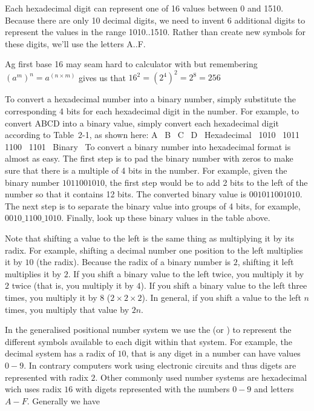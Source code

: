 Each hexadecimal digit can represent one of 16 values between 0 and 1510. Because there are only 10 decimal digits, we need to invent 6 additional digits to represent the values in the range 1010..1510. Rather than create new symbols for these digits, we'll use the letters A..F. 

Ag first base 16 may seam hard to calculator with but remembering $(a^m)^n = a^(n \times m)$ gives us that $16^2 = (2^4)^2 = 2^8 = 256$


To convert a hexadecimal number into a binary number, simply substitute the corresponding 4 bits for each hexadecimal digit in the number. For example, to convert ABCD into a binary value, simply convert each hexadecimal digit according to Table 2-1, as shown here: A  B  C  D  Hexadecimal  1010  1011  1100  1101  Binary  To convert a binary number into hexadecimal format is almost as easy. The first step is to pad the binary number with zeros to make sure that there is a multiple of 4 bits in the number. For example, given the binary number $1011001010$, the first step would be to add 2 bits to the left of the number so that it contains 12 bits. The converted binary value is $001011001010$. The next step is to separate the binary value into groups of 4 bits, for example, $0010\_1100\_1010$. Finally, look up these binary values in the table above.

Note that shifting a value to the left is the same thing as multiplying it by its radix. For example, shifting a decimal number one position to the left multiplies it by $10$ (the radix). Because the radix of a binary number is $2$, shifting it left multiplies it by $2$. If you shift a binary value to the left twice, you multiply it by $2$ twice (that is, you multiply it by $4$). If you shift a binary value to the left three times, you multiply it by $8$ ($2 \times 2 \times 2$). In general, if you shift a value to the left $n$ times, you multiply that value by $2n$.

\myindent In the generalised positional number system we use the  (or ) to represent the different symbols available to each digit within that system. For example, the decimal system has a radix of $10$, that is any diget in a number can have values $0-9$. In contrary computers work using electronic circuits and thus digets are represented with radix $2$. Other commonly used number systems are hexadecimal wich uses radix $16$ with digets represented with the numbers $0-9$ and letters $A-F$. Generally we have

